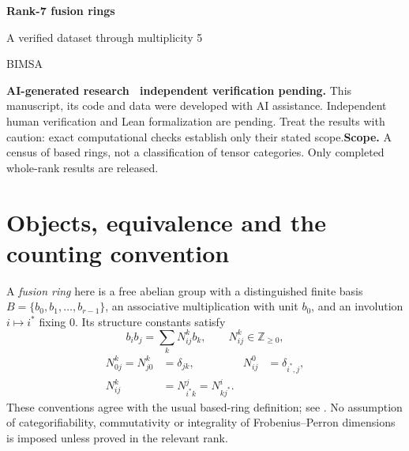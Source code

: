 \documentclass[11pt,a4paper]{article}
\theoremstyle{definition}\newtheorem{definition}[theorem]{Definition}\newtheorem{remark}[theorem]{Remark}
\newcommand{\NN}{\mathbb Z_{\geq0}}\newcommand{\FPdim}{\operatorname{FPdim}}
\begin{document}
\par\vspace{1cm}
{\sffamily\Huge\bfseries\color{ink} Rank-7 fusion rings\par}
\vspace{0.35cm}
{\sffamily\Large A verified dataset through multiplicity 5\par}
\vspace{0.65cm}{\large Sébastien Palcoux}\par{\small BIMSA}\par\vspace{0.35cm}{\small Computational companion, 26 October 2026}\par\vspace{0.8cm}
\begin{abstract}
We document 10,006 verified based-isomorphism classes of fusion rings of rank 7 through multiplicity 5, including 5,805 at the maximum multiplicity. The producer reports a complete enumeration. The complete optimized source is supplied and hash-matched, but full enumeration has not been independently reproduced. The account separates the mathematical coverage argument, the completed search, and independent verification of the emitted tensors. All duality types are included, and no categorifiability filter is applied. Code, machine-readable counts, full multiplication tensors and provenance records accompany the text.
\end{abstract}\vspace{0.4cm}\noindent\textbf{AI-generated research \textperiodcentered\ independent verification pending.} This manuscript, its code and data were developed with AI assistance. Independent human verification and Lean formalization are pending. Treat the results with caution: exact computational checks establish only their stated scope.\vfill\noindent\textbf{Scope.} A census of based rings, not a classification of tensor categories. Only completed whole-rank results are released.\newpage\tableofcontents\newpage

\section{Objects, equivalence and the counting convention}
A \emph{fusion ring} here is a free abelian group with a distinguished finite basis
$B=\{b_0,b_1,\ldots,b_{r-1}\}$, an associative multiplication with unit $b_0$,
and an involution $i\mapsto i^*$ fixing $0$. Its structure constants satisfy
\[
b_i b_j=\sum_k N_{ij}^{k}b_k,\qquad N_{ij}^{k}\in\NN,
\]
\begin{align}
N_{0j}^{k}=N_{j0}^{k}&=\delta_{jk},&N_{ij}^{0}&=\delta_{i^*,j},\\
N_{ij}^{k}&=N_{i^*k}^{j}=N_{kj^*}^{i}.&&\label{eq:reciprocity}
\end{align}
These conventions agree with the usual based-ring definition; see
\cite{EGNO,VS}. No assumption of categorifiability, commutativity or integrality
of Frobenius--Perron dimensions is imposed unless proved in the relevant rank.
\end{document}

